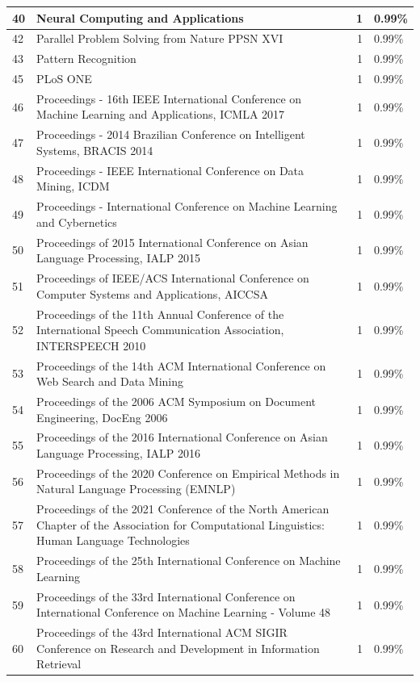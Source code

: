 \documentclass[
]{article}
\begin{document}
\begin{table}
\begin{tabular}[t]{l|l|r|l}
\hline
40 & Neural Computing and Applications & 1 & 0.99\%\\
\hline
42 & Parallel Problem Solving from Nature  PPSN XVI & 1 & 0.99\%\\
\hline
43 & Pattern Recognition & 1 & 0.99\%\\
\hline
45 & PLoS ONE & 1 & 0.99\%\\
\hline
46 & Proceedings - 16th IEEE International Conference on Machine Learning and Applications, ICMLA 2017 & 1 & 0.99\%\\
\hline
47 & Proceedings - 2014 Brazilian Conference on Intelligent Systems, BRACIS 2014 & 1 & 0.99\%\\
\hline
48 & Proceedings - IEEE International Conference on Data Mining, ICDM & 1 & 0.99\%\\
\hline
49 & Proceedings - International Conference on Machine Learning and Cybernetics & 1 & 0.99\%\\
\hline
50 & Proceedings of 2015 International Conference on Asian Language Processing, IALP 2015 & 1 & 0.99\%\\
\hline
51 & Proceedings of IEEE/ACS International Conference on Computer Systems and Applications, AICCSA & 1 & 0.99\%\\
\hline
52 & Proceedings of the 11th Annual Conference of the International Speech Communication Association, INTERSPEECH 2010 & 1 & 0.99\%\\
\hline
53 & Proceedings of the 14th ACM International Conference on Web Search and Data Mining & 1 & 0.99\%\\
\hline
54 & Proceedings of the 2006 ACM Symposium on Document Engineering, DocEng 2006 & 1 & 0.99\%\\
\hline
55 & Proceedings of the 2016 International Conference on Asian Language Processing, IALP 2016 & 1 & 0.99\%\\
\hline
56 & Proceedings of the 2020 Conference on Empirical Methods in Natural Language Processing (EMNLP) & 1 & 0.99\%\\
\hline
57 & Proceedings of the 2021 Conference of the North American Chapter of the Association for Computational Linguistics: Human Language Technologies & 1 & 0.99\%\\
\hline
58 & Proceedings of the 25th International Conference on Machine Learning & 1 & 0.99\%\\
\hline
59 & Proceedings of the 33rd International Conference on International Conference on Machine Learning - Volume 48 & 1 & 0.99\%\\
\hline
60 & Proceedings of the 43rd International ACM SIGIR Conference on Research and Development in Information Retrieval & 1 & 0.99\%\\

\end{tabular}
\end{table}
\end{document}
